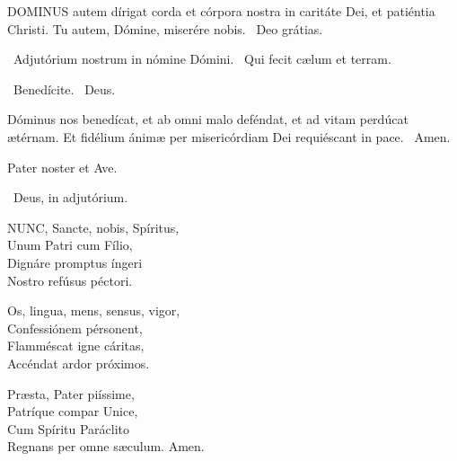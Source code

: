 


\lettrine[lines=2]{D}{OMINUS} autem dírigat corda et córpora nostra in caritáte Dei, et patiéntia Christi. Tu autem, Dómine, miserére nobis. \R\ Deo grátias.





\V\ Adjutórium nostrum in nómine Dómini. \R\ Qui fecit cælum et terram.

\V\ Benedícite. \R\ Deus.

 Dóminus nos benedícat, et ab omni malo deféndat, et ad vitam perdúcat ætérnam. Et fidélium ánimæ per misericórdiam Dei requiéscant in pace. \R\ Amen.



Pater noster et Ave.

\V\ Deus, in adjutórium.


\lettrine[lines=2]{N}{UNC}, Sancte, nobis, Spíritus,\\
Unum Patri cum Fílio,\\
Dignáre promptus íngeri\\
Nostro refúsus péctori.

Os, lingua, mens, sensus, vigor,\\
Confessiónem pérsonent,\\
Flamméscat igne cáritas,\\
Accéndat ardor próximos.

Præsta, Pater piíssime,\\
Patríque compar Unice,\\
Cum Spíritu Paráclito\\
Regnans per omne sæculum. Amen.

